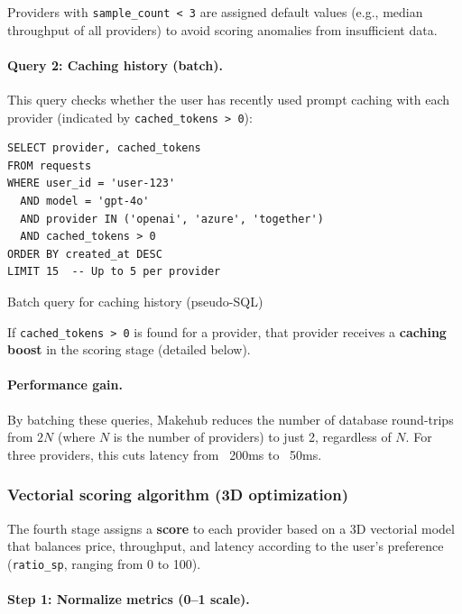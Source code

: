 \documentclass[english]{article}
\begin{document}
Providers with \texttt{sample\_count < 3} are assigned default values (e.g., median throughput of all providers) to avoid scoring anomalies from insufficient data.

\paragraph{Query 2: Caching history (batch).}

This query checks whether the user has recently used prompt caching with each provider (indicated by \texttt{cached\_tokens > 0}):

\begin{listing}[H]
\begin{verbatim}
SELECT provider, cached_tokens
FROM requests
WHERE user_id = 'user-123'
  AND model = 'gpt-4o'
  AND provider IN ('openai', 'azure', 'together')
  AND cached_tokens > 0
ORDER BY created_at DESC
LIMIT 15  -- Up to 5 per provider
\end{verbatim}
\caption{Batch query for caching history (pseudo-SQL)}
\end{listing}

If \texttt{cached\_tokens > 0} is found for a provider, that provider receives a \textbf{caching boost} in the scoring stage (detailed below).

\paragraph{Performance gain.}

By batching these queries, Makehub reduces the number of database round-trips from $2N$ (where $N$ is the number of providers) to just 2, regardless of $N$. For three providers, this cuts latency from ~200ms to ~50ms.

\subsubsection{Vectorial scoring algorithm (3D optimization)}

The fourth stage assigns a \textbf{score} to each provider based on a 3D vectorial model that balances price, throughput, and latency according to the user's preference (\texttt{ratio\_sp}, ranging from 0 to 100).

\paragraph{Step 1: Normalize metrics (0–1 scale).}
\end{document}
